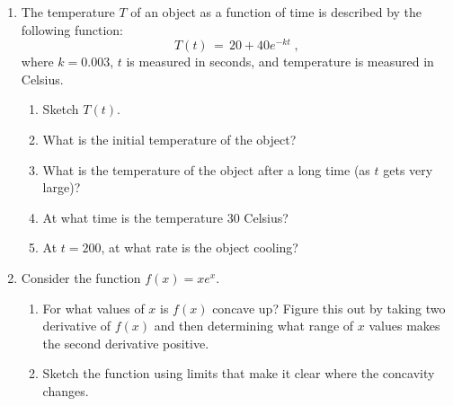 \documentclass[12pt]{article}
\begin{document}
\begin{enumerate}
\setlength{\itemsep}{33mm}

\item The temperature $T$ of an object as a function of time is
  described by the following function:
  \begin{equation}
    T(t) \, = \, 20 + 40e^{-kt} \;,
  \end{equation}
  where $k = 0.003$, $t$ is measured in seconds, and temperature is
  measured in Celsius.
  \begin{enumerate}
    \setlength{\itemsep}{8mm}
  \item Sketch $T(t)$.
  \item What is the initial temperature of the object?
  \item What is the temperature of the object after a long time (as
    $t$ gets very large)?
  \item At what time is the temperature $30$ Celsius?
  \item At $t=200$, at what rate is the object cooling?
  \end{enumerate}


  
\item Consider the function $f(x) = xe^x$.
  \begin{enumerate}
    \item For what values of $x$ is $f(x)$ concave up? Figure this out
      by taking two derivative of $f(x)$ and then determining what range
      of $x$ values makes the second derivative positive.
    \item Sketch the function using limits that make it clear where
      the concavity changes. 
  \end{enumerate}



\end{enumerate}
\end{document}
